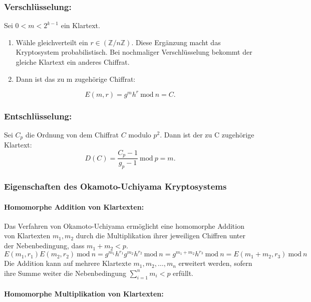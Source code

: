 \subsubsection*{Verschlüsselung:} 
Sei $0<m<2^{k-1}$ ein Klartext.
\begin{enumerate}
	\item Wähle gleichverteilt ein $r\in(\mathbb{Z}/ n\mathbb{Z})$. Diese Ergänzung macht das Kryptosystem probabilistisch. Bei nochmaliger Verschlüsselung bekommt der gleiche Klartext ein anderes Chiffrat.
	\item Dann ist das zu m zugehörige Chiffrat: 
\end{enumerate}
	\begin{equation*}
		E(m,r)=g^m h^r\ \text{mod}\ n = C.
	\end{equation*}

\subsubsection*{Entschlüsselung:} 
Sei $C_p$ die Ordnung von dem Chiffrat $C$ modulo $p^2$. Dann ist der zu C zugehörige Klartext:
\begin{equation*}
D(C)=\frac{C_p-1}{g_p-1}\ \text{mod}\ p = m.
\end{equation*}

\subsubsection{Eigenschaften des Okamoto-Uchiyama Kryptosystems}
\paragraph{Homomorphe Addition von Klartexten:}

Das Verfahren von Okamoto-Uchiyama ermöglicht eine homomorphe Addition von Klartexten $m_1, m_2$ durch die Multiplikation ihrer jeweiligen Chiffren unter der Nebenbedingung, dass $m_1+m_2<p$.
\begin{equation*}
E(m_1,r_1) E(m_2,r_2)\ \text{mod}\ n = g^{m_1} h^{r_1}g^{m_2} h^{r_2} \ \text{mod}\ n =  g^{m_1+m_2} h^{r_3}\ \text{mod}\ n = E(m_1+m_2,r_3) \ \text{mod}\ n\  
\end{equation*}
Die Addition kann auf mehrere Klartexte $m_1,m_2,\ldots,m_n$ erweitert werden, sofern ihre Summe weiter die Nebenbedingung $\sum_{i=1}^{n} m_i < p$ erfüllt.

\paragraph{Homomorphe Multiplikation von Klartexten:}

